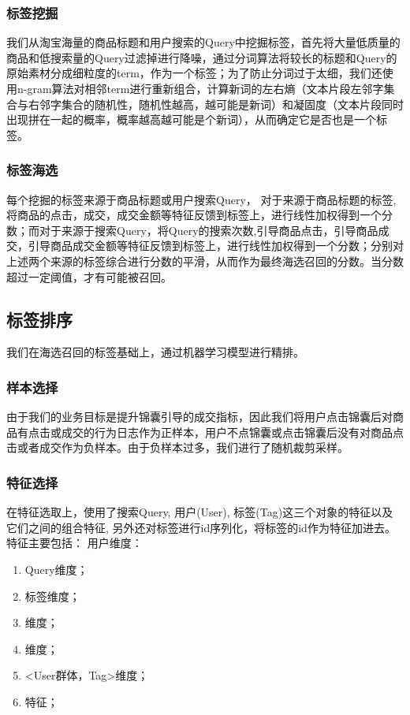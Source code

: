 \subsubsection{标签挖掘}
我们从淘宝海量的商品标题和用户搜索的Query中挖掘标签，首先将大量低质量的商品和低搜索量的Query过滤掉进行降噪，通过分词算法将较长的标题和Query的原始素材分成细粒度的term，作为一个标签；为了防止分词过于太细，我们还使用n-gram算法对相邻term进行重新组合，计算新词的左右熵（文本片段左邻字集合与右邻字集合的随机性，随机性越高，越可能是新词）和凝固度（文本片段同时出现拼在一起的概率，概率越高越可能是个新词），从而确定它是否也是一个标签。
\subsubsection{标签海选}
每个挖掘的标签来源于商品标题或用户搜索Query， 对于来源于商品标题的标签, 将商品的点击，成交，成交金额等特征反馈到标签上，进行线性加权得到一个分数；而对于来源于搜索Query，将Query的搜索次数,引导商品点击，引导商品成交，引导商品成交金额等特征反馈到标签上，进行线性加权得到一个分数；分别对上述两个来源的标签综合进行分数的平滑，从而作为最终海选召回的分数。当分数超过一定阈值，才有可能被召回。

\subsection{标签排序}
我们在海选召回的标签基础上，通过机器学习模型进行精排。
\subsubsection{样本选择}
由于我们的业务目标是提升锦囊引导的成交指标，因此我们将用户点击锦囊后对商品有点击或成交的行为日志作为正样本，用户不点锦囊或点击锦囊后没有对商品点击或者成交作为负样本。由于负样本过多，我们进行了随机裁剪采样。

\subsubsection{特征选择}
在特征选取上，使用了搜索Query, 用户(User), 标签(Tag)这三个对象的特征以及它们之间的组合特征,  另外还对标签进行id序列化，将标签的id作为特征加进去。特征主要包括：
用户维度：
\begin{enumerate}
\item Query维度；
\item 标签维度；
\item <Query, Tag>维度；
\item <User, Tag>维度；
\item <User群体，Tag>维度；
\item <Query, User, Tag>特征；
\end{enumerate}

